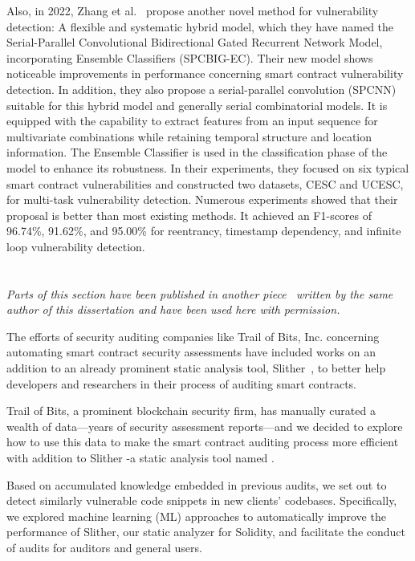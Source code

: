 Also, in 2022, Zhang et al.~\cite{zhang2022spcbig} propose another novel method for vulnerability detection:
A flexible and systematic hybrid model, which they have named the Serial-Parallel Convolutional Bidirectional Gated
Recurrent Network Model, incorporating Ensemble Classifiers (SPCBIG-EC).
Their new model shows noticeable improvements in performance concerning smart contract vulnerability detection.
In addition, they also propose a serial-parallel convolution (SPCNN) suitable for this hybrid model and generally serial combinatorial models.
It is equipped with the capability to extract features from an input sequence for multivariate combinations while retaining temporal structure and location information.
The Ensemble Classifier is used in the classification phase of the model to enhance its
robustness. In their experiments, they focused on six typical smart contract vulnerabilities and constructed two
datasets, CESC and UCESC, for multi-task vulnerability detection.
Numerous experiments showed that their proposal is better than most existing methods.
It achieved an F1-scores of 96.74\%, 91.62\%, and 95.00\% for reentrancy, timestamp
dependency, and infinite loop vulnerability detection.

\section{\slithersimil}

\textit{Parts of this section have been published in another piece~\cite{pilehchiha_2020} written by the same author of this dissertation and have been used here with permission.}

The efforts of security auditing companies like Trail of Bits, Inc. concerning automating smart contract security assessments have included works on an addition to an already prominent static analysis tool, Slither~\cite{slither}, to better help developers and researchers in their process of auditing smart contracts.

Trail of Bits, a prominent blockchain security firm, has manually curated a wealth of data—years of security assessment reports—and we decided to explore how to use this data to make the smart
contract auditing process more efficient with addition to Slither -a static analysis tool named \slithersimil.

Based on accumulated knowledge embedded in previous audits, we set out to detect similarly vulnerable code snippets in new clients' codebases.
Specifically, we explored machine learning (ML) approaches to automatically improve the performance of Slither, our static analyzer for Solidity, and facilitate the conduct of audits for auditors and general users.

